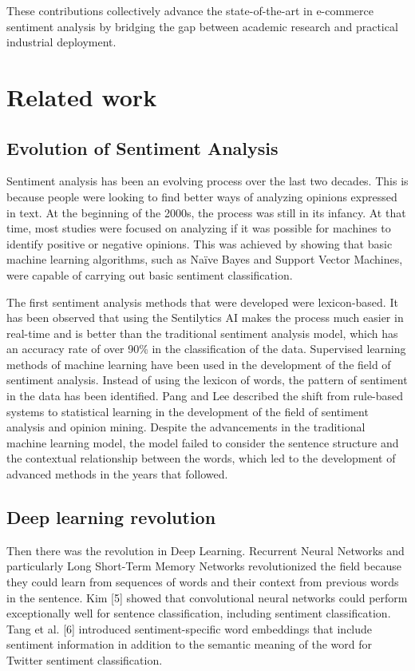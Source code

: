 \documentclass[11pt,a4paper]{article}
\begin{document}
These contributions collectively advance the state-of-the-art in e-commerce sentiment analysis by bridging the gap between academic research and practical industrial deployment.


\section{Related work}

\subsection{Evolution of Sentiment Analysis}

Sentiment analysis has been an evolving process over the last two decades. This is because people were looking to find better ways of analyzing opinions expressed in text. At the beginning of the 2000s, the process was still in its infancy. At that time, most studies were focused on analyzing if it was possible for machines to identify positive or negative opinions. This was achieved by showing that basic machine learning algorithms, such as Naïve Bayes and Support Vector Machines, were capable of carrying out basic sentiment classification.

The first sentiment analysis methods that were developed were lexicon-based. It has been observed that using the Sentilytics AI makes the process much easier in real-time and is better than the traditional sentiment analysis model, which has an accuracy rate of over 90\% in the classification of the data. Supervised learning methods of machine learning have been used in the development of the field of sentiment analysis. Instead of using the lexicon of words, the pattern of sentiment in the data has been identified. Pang and Lee described the shift from rule-based systems to statistical learning in the development of the field of sentiment analysis and opinion mining. Despite the advancements in the traditional machine learning model, the model failed to consider the sentence structure and the contextual relationship between the words, which led to the development of advanced methods in the years that followed.


\subsection{Deep learning revolution}

Then there was the revolution in Deep Learning. Recurrent Neural Networks and particularly Long Short-Term Memory Networks revolutionized the field because they could learn from sequences of words and their context from previous words in the sentence. Kim [5] showed that convolutional neural networks could perform exceptionally well for sentence classification, including sentiment classification. Tang et al. [6] introduced sentiment-specific word embeddings that include sentiment information in addition to the semantic meaning of the word for Twitter sentiment classification.
\end{document}
